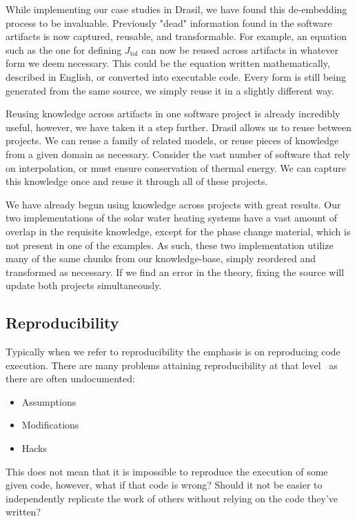 \documentclass[sigconf]{acmart}
\newcommand{\jtol}{$J_{\mbox{tol}}$}
\begin{document}
While implementing our case studies in Drasil, we have found this de-embedding 
process to be invaluable. Previously "dead" information found in the software 
artifacts is now captured, reusable, and transformable. For example, an equation 
such as the one for defining \jtol{} can now be reused across artifacts in 
whatever form we deem necessary. This could be the equation written 
mathematically, described in English, or converted into executable code. Every 
form is still being generated from the same source, we simply reuse it in a 
slightly different way.

Reusing knowledge across artifacts in one software project is already 
incredibly useful, however, we have taken it a step further. Drasil allows us 
to reuse between projects. We can reuse a family of related models, or reuse 
pieces of knowledge from a given domain as necessary. Consider the vast number 
of software that rely on interpolation, or must ensure conservation of thermal 
energy. We can capture this knowledge once and reuse it through all of these 
projects.

We have already begun using knowledge across projects with great results. Our 
two implementations of the solar water heating systems have a vast amount of 
overlap in the requisite knowledge, except for the phase change material, which 
is not present in one of the examples. As such, these two implementation utilize 
many of the same chunks from our knowledge-base, simply reordered and 
transformed as necessary. If we find an error in the theory, fixing the source 
will update both projects simultaneously.

\subsection{Reproducibility}

Typically when we refer to reproducibility the emphasis is on reproducing code 
execution. There are many problems attaining reproducibility at that 
level~\cite{IonescuAndJansson2013} as there are often undocumented:

\begin{itemize}
\item Assumptions
\item Modifications
\item Hacks
\end{itemize}

This does not mean that it is impossible to reproduce the execution of some 
given code, however, what if that code is wrong? Should it not be easier to 
independently replicate the work of others without relying on the code they've 
written?
\end{document}
